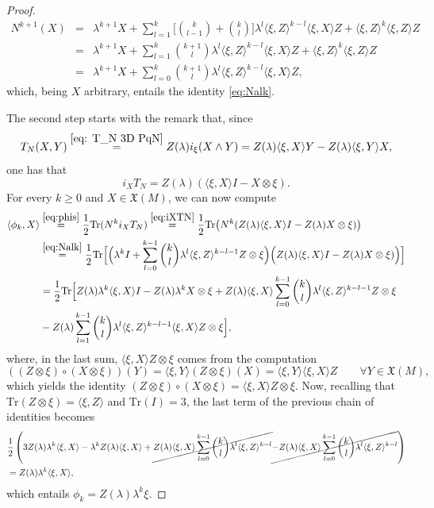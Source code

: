 \documentclass[12pt]{article}
\begin{document}
\begin{proof}
\begin{eqnarray*}
N^{k+1}(X)%
&=&\lambda^{k+1}X+\sum_{l=1}^{k}\Big[{k\choose l-1}+{k\choose l}\Big]\lambda^{l}\langle\xi,Z\rangle^{k-l}\langle\xi,X\rangle Z+\langle\xi,Z\rangle^k\langle\xi,Z\rangle Z\\
&%
=&\lambda^{k+1}X+\sum_{l=1}^{k}{k+1\choose l}\lambda^{l}\langle\xi,Z\rangle^{k-l}\langle\xi,X\rangle Z+\langle\xi,Z\rangle^k\langle\xi,Z\rangle Z\\
&=&\lambda^{k+1}X+\sum_{l=0}^{k}{k+1\choose l}\lambda^{l}\langle\xi,Z\rangle^{k-l}\langle\xi,X\rangle Z,
\end{eqnarray*}
which, being $X$ arbitrary, entails the identity \eqref{eq:Nalk}.  

The second step starts with the remark that, since
	\[
	T_N(X,Y)\stackrel{\eqref{eq: T_N 3D PqN}}{=}Z(\lambda)i_\xi(X\wedge Y)=Z(\lambda)\langle\xi,X\rangle Y-Z(\lambda)\langle\xi,Y\rangle X,
	\]
	one has that
	\begin{equation}
		i_XT_N=Z(\lambda)(\langle\xi,X\rangle I-X\otimes\xi).\label{eq:iXTN}
	\end{equation}
	For every $k\geq 0$ and $X\in\mathfrak X(M)$, we can now compute
	\[
	\begin{split}
		\langle\phi_k,X\rangle&\stackrel{%
			\eqref{eq:phis}}{=}\frac12\text{Tr}(N^ki_XT_N)\stackrel{\eqref{eq:iXTN}}
		{=}\frac12\text{Tr}\big(N^k(Z(\lambda)\langle\xi,X\rangle I-Z(\lambda)X\otimes\xi)\big)\\
		&\stackrel{\eqref{eq:Nalk}}{=}\frac12\text{Tr}\Big[\Big(\lambda^kI+\sum_{l=0}^{k-1}{k\choose l}\lambda^l\langle\xi,Z\rangle^{k-l-1}Z\otimes\xi \Big)\Big(Z(\lambda)\langle\xi,X\rangle I-Z(\lambda)X\otimes\xi)\Big)\Big]\\
		&=\frac12\text{Tr}\Big[Z(\lambda)\lambda^k\langle\xi,X\rangle I-Z(\lambda)\lambda^kX\otimes\xi+Z(\lambda)\langle\xi,X\rangle\sum_{l=0}^{k-1}{k\choose l}\lambda^l\langle\xi,Z\rangle^{k-l-1}Z\otimes\xi\\
		&-Z(\lambda)\sum_{l=1}^{k-1}{k\choose l}\lambda^l\langle\xi,Z\rangle^{k-l-1}\langle\xi,X\rangle Z\otimes\xi\Big],
	\end{split}
	\]
	where, in the last sum, $\langle\xi,X\rangle Z\otimes\xi$ comes from the  computation
	\[
	\left((Z\otimes\xi)\circ (X\otimes\xi)\right)(Y)=\langle\xi,Y\rangle(Z\otimes\xi)(X)=\langle\xi,Y\rangle\langle\xi,X\rangle Z%
	\qquad\forall Y\in\mathfrak X(M),
	\]
	which yields the identity $(Z\otimes\xi)\circ(X\otimes\xi)=\langle\xi,X\rangle Z\otimes\xi$. Now, recalling that $\text{Tr}(Z\otimes\xi)=\langle\xi,Z\rangle$ and $\text{Tr}(I)=3$, the last term of the previous chain of identities becomes
	\[
	\begin{split}
		&\frac12\left(3Z(\lambda)\lambda^k\langle\xi,X\rangle-\lambda^kZ(\lambda)\langle\xi,X\rangle+\cancel{Z(\lambda)\langle\xi,X\rangle\sum_{l=0}^{k-1}{k\choose l}\lambda^l\langle\xi,Z\rangle^{k-l}}\cancel{-Z(\lambda)\langle\xi,X\rangle\sum_{l=0}^{k-1}{k\choose l}\lambda^l\langle\xi,Z\rangle^{k-l}}
		\right)\\
		&=Z(\lambda)\lambda^k\langle\xi,X\rangle,
	\end{split}
	\]
	which entails $\phi_k=Z(\lambda)\lambda^k\xi$.
\end{proof}
\end{document}
